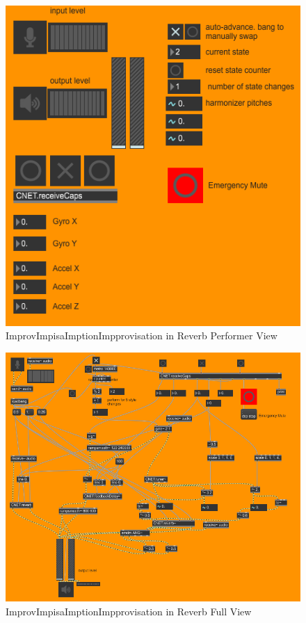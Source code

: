 \begin{figure}
    \centering
    \includegraphics{diagrams/maxPatches/imporvPres.png}
    \caption{ImprovImpisaImptionImpprovisation in Reverb Performer View}
    \label{fig:ImprovPres}
\end{figure}

\begin{figure}
    \centering
    \includegraphics{diagrams/maxPatches/improvRaw.png}
    \caption{ImprovImpisaImptionImpprovisation in Reverb Full View}
    \label{fig:improvFull}
\end{figure}

